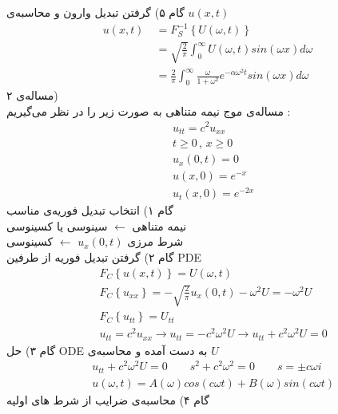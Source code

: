 گام ۵) گرفتن تبدیل وارون و محاسبه‌ی 
$u(x,t)$
\begin{equation*}
	\begin{aligned}
		u(x,t)&\ =
		F_S^{-1}\left\{U(\omega,t)\right\}
		\\ &\
		=\sqrt{\frac2\pi}\int_0^\infty U(\omega,t)sin(\omega x)d\omega
		\\ &\
		=\frac2\pi\int_0^\infty \frac\omega{1+\omega^2}e^{-\alpha\omega^2t}sin(\omega x)d\omega
	\end{aligned}
\end{equation*}
مساله‌ی ۲)\\
مساله‌ی موج نیمه متناهی به صورت زیر را در نظر می‌گیریم :
\begin{equation*}
	\begin{aligned}
		&\
		u_{tt}=c^2u_{xx}
		\\ &\
		t\ge 0 \, , \, x\ge0
		\\ &\
		u_x(0,t)=0
		\\ &\
		u(x,0)=e^{-x}
		\\ &\
		u_t(x,0)=e^{-2x}
	\end{aligned}
\end{equation*}
گام ۱) انتخاب تبدیل فوریه‌ی مناسب\\
نیمه متناهی
$\leftarrow$
سینوسی یا کسینوسی\\
شرط مرزی
$u_x(0,t)$
$\leftarrow$
کسینوسی\\
گام ۲) گرفتن تبدیل فوریه از طرفین PDE
\begin{equation*}
	\begin{aligned}
		&\
		F_C\left\{u(x,t)\right\}=U(\omega,t)
		\\ &\
		F_C\left\{u_{xx}\right\}=-\sqrt{\frac2\pi}u_x(0,t)-\omega^2U=-\omega^2U
		\\ &\
		F_C\left\{u_{tt}\right\}=U_{tt}
		\\ &\
		u_{tt}=c^2u_{xx}\rightarrow u_{tt}=-c^2\omega^2U\rightarrow u_{tt}+c^2\omega^2U=0
	\end{aligned}
\end{equation*}
گام ۳) حل ODE به دست آمده و محاسبه‌ی 
$U$
\begin{equation*}
	\begin{aligned}
		&\
		u_{tt}+c^2\omega^2U=0 \qquad s^2+c^2\omega^2=0 \qquad s=\pm c\omega i
		\\ &\
		u(\omega,t)=A(\omega)cos(c\omega t)+B(\omega)sin(c\omega t)
	\end{aligned}
\end{equation*}
گام ۴) محاسبه‌ی ضرایب از شرط های اولیه
